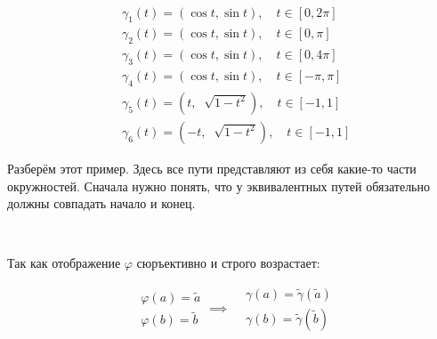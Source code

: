 \documentclass[../main.tex]{subfiles}
\begin{document}
\begin{example}

    ~

    \begin{equation*}
        \begin{aligned}
            &\gamma _1\left( t\right)= \left( \cos t, \sin t\right),\quad t \in \left[ 0, 2 \pi \right]\\
            &\gamma _2\left( t\right)=\left( \cos t, \sin t\right),\quad t \in \left[ 0, \pi \right]\\
            &\gamma _3\left( t\right)=\left( \cos t, \sin t\right),\quad t \in \left[ 0, 4 \pi \right]\\
            &\gamma _4\left( t\right)=\left( \cos t, \sin t\right),\quad t \in \left[ - \pi , \pi \right]\\
            &\gamma _5\left( t\right)=\left( t, \;\sqrt[]{1-t^2}\right),\quad t \in \left[ -1, 1\right]\\
            &\gamma _6\left( t\right)=\left( -t, \;\sqrt[]{1-t^2}\right),\quad t \in \left[ -1, 1\right]
        \end{aligned}
    \end{equation*}

    Разберём этот пример. Здесь все пути представляют из себя какие-то части окружностей. 
    Сначала нужно понять, что у эквивалентных путей обязательно должны совпадать начало и конец.

    \vspace{15mm}
    ~
     
    Так как отображение \( \varphi \) сюръективно и строго возрастает: 

    \begin{equation*}
        \begin{aligned}
            &\varphi \left( a\right)= \tilde{a}\\
            &\varphi \left( b\right)= \tilde{b}
        \end{aligned}
        \implies 
        \begin{aligned}
            &\gamma \left( a\right)= \tilde{ \gamma }\left( \tilde{a}\right)\\ 
            &\gamma\left( b\right)= \tilde{ \gamma }( \tilde{b}) 
        \end{aligned}
    \end{equation*}


\end{example}
\end{document}
